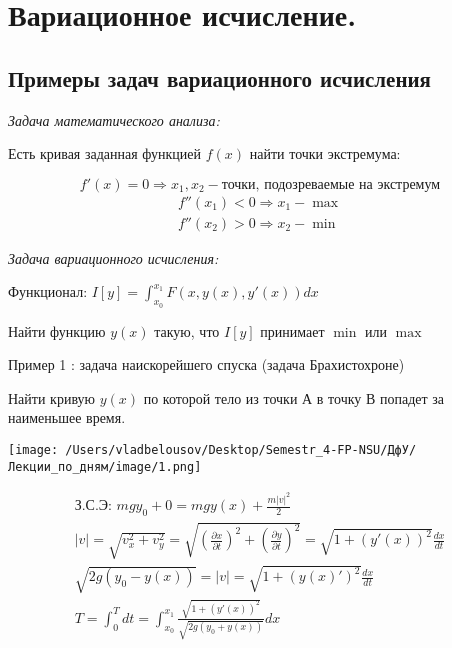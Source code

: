 \documentclass[12pt, a4paper]{report}
\begin{document}
\fi


\chapter{Вариационное исчисление.}

\section{Примеры задач вариационного исчисления}

\textit{Задача математического анализа: } 



Есть кривая заданная функцией \( f(x) \) найти точки экстремума: 

\[  f'(x)=0 \Rightarrow {x_1,x_2}-{\text{точки, подозреваемые на экстремум}  }   \] 
\begin{gather*}
    f''(x_1)<0 \Rightarrow x_1  - \max  \\
    f''(x_2)>0 \Rightarrow x_2 - \min    
\end{gather*}

\textit{Задача вариационного исчисления:} 

Функционал: \( I [y]= \int_{x_0}^{x_1}F(x,y(x),y'(x))dx  \) 

Найти функцию \( y(x) \) такую, что \( I[y] \) принимает \( \min  \) или \( \max  \) 

\begin{flushleft}
    Пример 1 : задача наискорейшего спуска (задача Брахистохроне)
\end{flushleft}

Найти кривую \( y(x) \)  по которой тело из точки А в точку В попадет за наименьшее время. 

\begin{center}
    \texttt{[image: /Users/vladbelousov/Desktop/Semestr\_4-FP-NSU/ДфУ/Лекции\_по\_дням/image/1.png]}
\end{center}

\begin{gather*}
   \text{З.С.Э: }  mgy_0+0= mgy(x)+ \frac{m |v| ^2}{2} \\
    \lvert v  \rvert =\sqrt{v_x ^2 + v_y ^2} = \sqrt{\left( \frac{\partial x}{\partial t}  \right) ^2 +\left( \frac{\partial y }{\partial t}  \right) ^2 }= \sqrt{1+(y'(x))^2} \frac{dx}{dt} \\
    \sqrt{2g(y_0- y(x)) }= |v|= \sqrt{1+(y(x)')^2} \frac{dx}{dt} \\
    T= \int_{0}^{T}dt= \int_{x_0 }^{x_1} \frac{\sqrt{1+(y'(x))^2}}{\sqrt{2g(y_0+ y(x)) }} dx   
\end{gather*}
\end{document}

